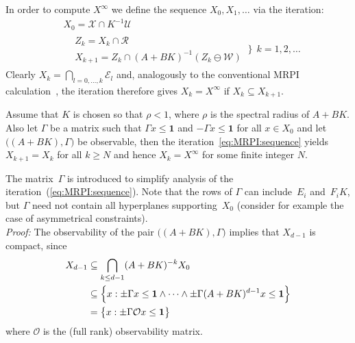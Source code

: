 \documentclass{ifacconf}
\def\bpf{\textnormal{\textit{Proof:}\hspace{1ex}}}
\newcommand{\Obs}{\mathcal{O}}
\providecommand{\E}{\mathcal E}
\providecommand{\W}{\mathcal W}
\providecommand{\X}{\mathcal X}
\providecommand{\R}{\mathcal R}
\providecommand{\bfa}[1]{\mathbf{#1}}
\begin{document}
%
In order to compute $X^\infty$ we define the sequence $X_0,X_1,\ldots$ via the iteration:
%
\begin{equation}\label{eq:MRPI:sequence}
\begin{aligned}
  & X_0 = \X\cap K^{-1}\mathcal U \\
  & \begin{aligned}
      & Z_k = X_k\cap\R\\
      & X_{k+1} = Z_k\cap(A+BK)^{-1}(Z_k\ominus\W)
    \end{aligned} 
  \ \Biggr\} \ \ k = 1,2,\ldots
\end{aligned}
\end{equation}
%
Clearly $X_k = \bigcap_{l=0,\ldots,k}\E_l$ and, analogously to the conventional MRPI calculation~\citep{Kolmanovsky:1998}, the iteration therefore gives $X_k = X^\infty$ if $X_k\subseteq X_{k+1}$.

\vspace{0.5\baselineskip}
\begin{thm}\label{thm2}
Assume that $K$ is chosen so that $\rho < 1$, where $\rho$ is the spectral radius of $A+BK$. Also let $\Gamma$ be a matrix such that $\Gamma x\leq\bfa{1}$ and $-\Gamma x\leq\bfa{1}$ for all $x\in X_0$ and let $\bigl((A+BK),\Gamma\bigr)$ be observable, then the iteration~\eqref{eq:MRPI:sequence} %
yields $X_{k+1}=X_k$ for all $k\geq N$ and hence $X_k=X^\infty$ for some finite integer $N$.
\end{thm}
%
The matrix~$\Gamma$ is introduced to simplify  analysis of the iteration~(\ref{eq:MRPI:sequence}). Note that the rows of $\Gamma$ can include~$E_i$ and~$F_iK$, but $\Gamma$ need not contain all hyperplanes supporting~$X_0$ (consider for example the case of asymmetrical constraints).
%
\\[1em]
%
\bpf
%
The observability of the pair $\bigl((A+BK),\Gamma\bigr)$ implies that $X_{d-1}$ is compact, since 
\begin{align*}
X_{d-1} 
&\subseteq\bigcap_{k\leq d-1}(A+BK)^{-k} X_0\\
&\subseteq \Bigl\{x:\pm\Gamma x\leq\bfa{1}\wedge\dots\wedge\pm\Gamma(A+BK)^{d-1} x\leq\bfa{1} \Bigr\}\\
& = \bigl\{x:\pm\Gamma \Obs x\leq \bfa{1}\bigr\}
\end{align*}
where $\Obs$ is the (full rank) observability matrix.
\end{document}
